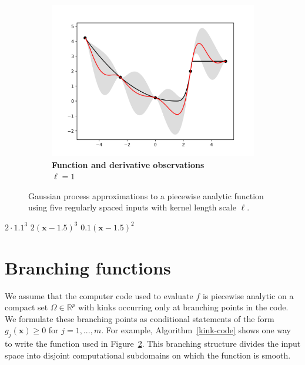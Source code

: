 \documentclass{article}
\renewcommand{\vec}[1]{\mathbf{#1}}
\newcommand{\R}{\mathbb{R}}
\begin{document}
\begin{figure}[H]
    \begin{subfigure}[t]{.33\textwidth}
      \centering
      \includegraphics[scale=0.35]{figures/kink-shortder.png}
      \caption{\textbf{Function and derivative observations} \\ $\ell = 1$}
      \label{kink:short}
    \end{subfigure}
		\caption{Gaussian process approximations to a piecewise analytic function using five regularly spaced inputs with kernel length scale $\ell$.}
		\label{kink}
\end{figure}
\begin{algorithm}[H]
    \captionsetup{justification=centering}
    \begin{algorithmic}
    \IF{$g_1(\vec{x}) \geq 0$}
        \RETURN $2\cdot1.1^3$
    \ELSIF{$g_2(\vec{x}) \geq 0$}
        \RETURN $2(\vec{x}-1.5)^3$
    \ELSE
        \RETURN $0.1(\vec{x}-1.5)^2$
    \ENDIF
    \end{algorithmic}
    \caption{: $g_1(\vec{x}) = \vec{x}-2.6$, $g_2(\vec{x}) = \vec{x}-1.5$}
	\label{kink-code}
\end{algorithm}

\section{Branching functions}
We assume that the computer code used to evaluate $f$ is piecewise analytic on a compact set $\Omega \in \R^p$ with kinks occurring only at branching points in the code. We formulate these branching points as conditional statements of the form $g_j(\vec{x}) \geq 0$ for $j=1,...,m$. For example, Algorithm~\ref{kink-code} shows one way to write the function used in Figure~\ref{kink}. This branching structure divides the input space into disjoint computational subdomains on which the function is smooth.
\end{document}
